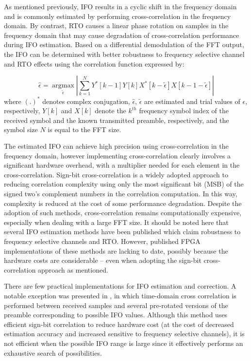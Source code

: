 As mentioned previously, IFO results in a cyclic shift in the frequency domain and is commonly estimated by performing cross-correlation in the frequency domain.
By contrast, RTO causes a linear phase rotation on samples in the frequency domain that may cause degradation of cross-correlation performance during IFO estimation.
Based on a differential demodulation of the FFT output, the IFO can be determined with better robustness to frequency selective channel and RTO effects using the correlation function \cite{Park2002} expressed by:

\begin{equation}
\label{integerCFO}
\hat{\epsilon} =\underset{\tilde{\epsilon}}{\operatorname{argmax}}  \left|\sum_{k=1}^{N} Y^{*}[k-1] Y[k]  X^{*}[k-\tilde{\epsilon}]  X[k-1-\tilde{\epsilon}]\right|
\end{equation}
where $(.)^{*}$ denotes complex conjugation, $\hat{\epsilon}$, $\tilde{\epsilon}$ are estimated and trial values of $\epsilon$, respectively,
$Y[k]$ and $X[k]$ denote the $k^{th}$ frequency symbol index of the received symbol and the known transmitted preamble, respectively, and the symbol size $N$ is equal to the FFT size.

The estimated IFO can achieve high precision using cross-correlation in the frequency domain, however implementing cross-correlation clearly involves a significant hardware overhead, with a multiplier needed for each element in the cross-correlation.
Sign-bit cross-correlation \cite{Schwoerer2002} is a widely adopted approach to reducing correlation complexity using only the most significant bit (MSB) of the signed two's complement numbers in the correlation computation. In this way, complexity is reduced at the cost of some performance degradation.
Despite the adoption of such methods, cross-correlation remains computationally expensive, especially when dealing with a large FFT size.
It should be noted here that several IFO estimation methods have been published which claim robustness to frequency selective channels and RTO. However, published FPGA implementations of these methods are lacking to date, possibly because the hardware costs are considerable -- even when adopting the sign-bit cross-correlation approach as mentioned.%

There are few practical implementations for IFO estimation and correction.
A notable exception was presented in \cite{Kim2008}, in which time-domain cross correlation is performed between received samples and several pre-rotated versions of the preamble corresponding to possible IFO values. Although this method uses efficient sign-bit correlation to reduce hardware cost (at the cost of decreased estimation accuracy and increased sensitive to frequency
selective channels), it is not efficient when the possible IFO range is large since it effectively performs an exhaustive search of possibilities.


